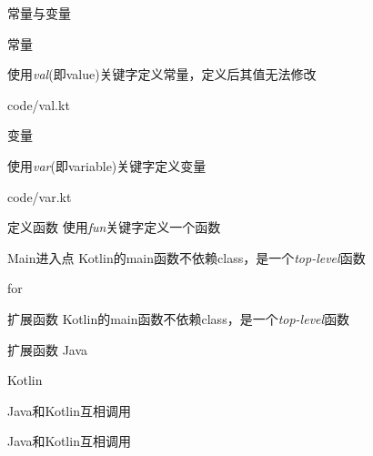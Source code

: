 \documentclass[xcolor={dvipsnames}]{beamer}
\begin{document}
\begin{frame}[fragile]{常量与变量}
  \begin{block}{常量}

    使用\emph{val}(即value)关键字定义常量，定义后其值无法修改
    \begin{lstinputlisting}[language=Kotlin]{code/val.kt}
    \end{lstinputlisting}
  \end{block}

  \begin{block}{变量}

  使用\emph{var}(即variable)关键字定义变量
  \begin{lstinputlisting}[language=Kotlin]{code/var.kt}
  \end{lstinputlisting}
  \end{block}
\end{frame}

\begin{frame}{定义函数}
  使用\emph{fun}关键字定义一个函数
  
\end{frame}

\begin{frame}{Main进入点}
  Kotlin的main函数不依赖class，是一个\emph{top-level}函数
  
\end{frame}

\begin{frame}{for}
  
\end{frame}

\begin{frame}{扩展函数}
  Kotlin的main函数不依赖class，是一个\emph{top-level}函数
  
\end{frame}

\begin{frame}{扩展函数}
  \alert{Java}
  
  \alert{Kotlin}
  
\end{frame}

\begin{frame}{Java和Kotlin互相调用}
  
\end{frame}

\begin{frame}{Java和Kotlin互相调用}
  
\end{frame}
\end{document}
